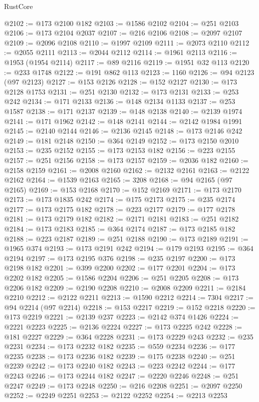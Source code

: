 \begin{lexlean}{RustCore}
\begin{coremodule}
@2102 := @173 @2100 @182
@2103 := @1586 @2102
@2104 := @251 @2103
@2106 := @173 @2104 @2037
@2107 := @216 @2106
@2108 := @2097 @2107
@2109 := @2096 @2108
@2110 := @1997 @2109
@2111 := @2073 @2110
@2112 := @2055 @2111
@2113 := @2044 @2112
@2114 := @1961 @2113
@2116 := @1953 (@1954 @2114)
@2117 := @89 @2116
@2119 := @1951 @32 @113
@2120 := @233 @1748
@2122 := @191 @862 @113
@2123 := 1160
@2126 := @94 @2123 (@97 @2123)
@2127 := @153 @2126
@2128 := @152 @2127
@2130 := @173 @2128 @1753
@2131 := @251 @2130
@2132 := @173 @2131
@2133 := @253 @242
@2134 := @171 @2133
@2136 := @148 @2134 @1133
@2137 := @253 @1587
@2138 := @171 @2137
@2139 := @148 @2138
@2140 := @2139 @1974
@2141 := @171 @1962
@2142 := @148 @2141
@2144 := @2142 @1984 @1991
@2145 := @2140 @2144
@2146 := @2136 @2145
@2148 := @173 @2146 @242
@2149 := @181 @2148
@2150 := @364 @2149
@2152 := @173 @2150 @2010
@2153 := @235 @2152
@2155 := @173 @2153 @182
@2156 := @223 @2155
@2157 := @251 @2156
@2158 := @173 @2157
@2159 := @2036 @182
@2160 := @2158 @2159
@2161 := @2008 @2160
@2162 := @2132 @2161
@2163 := @2122 @2162
@2164 := @1539 @2163
@2165 := 3208
@2168 := @94 @2165 (@97 @2165)
@2169 := @153 @2168
@2170 := @152 @2169
@2171 := @173 @2170
@2173 := @173 @1835 @242
@2174 := @175 @2173
@2175 := @235 @2174
@2177 := @173 @2175 @182
@2178 := @223 @2177
@2179 := @177 @2178
@2181 := @173 @2179 @182
@2182 := @2171 @2181
@2183 := @251 @2182
@2184 := @173 @2183
@2185 := @364 @2174
@2187 := @173 @2185 @182
@2188 := @223 @2187
@2189 := @251 @2188
@2190 := @173 @2189
@2191 := @1965 @374
@2193 := @173 @2191 @242
@2194 := @179 @2193
@2195 := @364 @2194
@2197 := @173 @2195 @376
@2198 := @235 @2197
@2200 := @173 @2198 @182
@2201 := @399 @2200
@2202 := @177 @2201
@2204 := @173 @2202 @182
@2205 := @1586 @2204
@2206 := @251 @2205
@2208 := @173 @2206 @182
@2209 := @2190 @2208
@2210 := @2008 @2209
@2211 := @2184 @2210
@2212 := @2122 @2211
@2213 := @1590 @2212
@2214 := 7304
@2217 := @94 @2214 (@97 @2214)
@2218 := @153 @2217
@2219 := @152 @2218
@2220 := @173 @2219
@2221 := @2139 @237
@2223 := @2142 @374 @1426
@2224 := @2221 @2223
@2225 := @2136 @2224
@2227 := @173 @2225 @242
@2228 := @181 @2227
@2229 := @364 @2228
@2231 := @173 @2229 @243
@2232 := @235 @2231
@2234 := @173 @2232 @182
@2235 := @559 @2234
@2236 := @177 @2235
@2238 := @173 @2236 @182
@2239 := @175 @2238
@2240 := @251 @2239
@2242 := @173 @2240 @182
@2243 := @223 @2242
@2244 := @177 @2243
@2246 := @173 @2244 @182
@2247 := @2220 @2246
@2248 := @251 @2247
@2249 := @173 @2248
@2250 := @216 @2208
@2251 := @2097 @2250
@2252 := @2249 @2251
@2253 := @2122 @2252
@2254 := @2213 @2253

\end{coremodule}
\end{lexlean}
